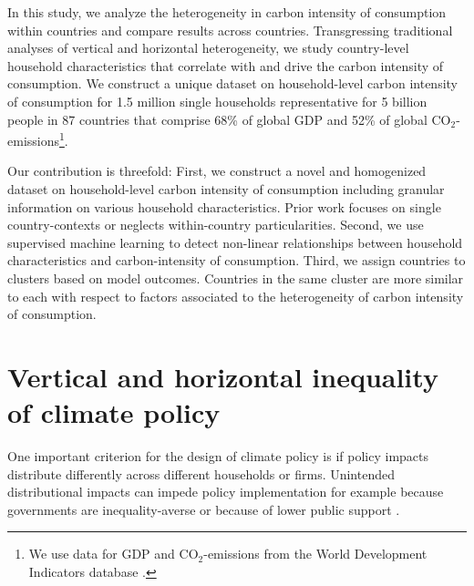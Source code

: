\documentclass[12pt, a4paper]{article}
\begin{document}

In this study, we analyze the heterogeneity in carbon intensity of consumption within countries and compare results across countries. Transgressing traditional analyses of vertical and horizontal heterogeneity, we study country-level household characteristics that correlate with and drive the carbon intensity of consumption. We construct a unique dataset on household-level carbon intensity of consumption for 1.5 million single households representative for 5 billion people in 87 countries that comprise 68\% of global GDP and 52\% of global CO$_{2}$-emissions\footnote{We use data for GDP and CO$_{2}$-emissions from the World Development Indicators database \autocite{WorldBankGroup.2023}.}.



Our contribution is threefold: First, we construct a novel and homogenized dataset on household-level carbon intensity of consumption including granular information on various household characteristics. Prior work focuses on single country-contexts or neglects within-country particularities. Second, we use supervised machine learning to detect non-linear relationships between household characteristics and carbon-intensity of consumption. Third, we assign countries to clusters based on model outcomes. Countries in the same cluster are more similar to each with respect to factors associated to the heterogeneity of carbon intensity of consumption. 




\section{Vertical and horizontal inequality of climate policy} \label{sec:literature}


One important criterion for the design of climate policy is if policy impacts distribute differently across different households or firms. Unintended distributional impacts can impede policy implementation for example because governments are inequality-averse or because of lower public support \autocite{Bergquist.2022,Douenne.2022}. 
\end{document}

